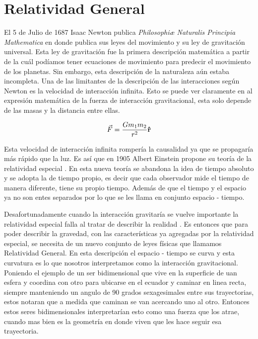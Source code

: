 \documentclass[../Main.tex]{subfiles}
\begin{document}
\section{Relatividad General}
El 5 de Julio de 1687 Isaac Newton publica \textit{Philosophiæ Naturalis Principia Mathematica} \cite{newton87a} en donde publica sus leyes del movimiento y su ley de gravitación universal. Esta ley de gravitación fue la primera descripción matemática a partir de la cuál podíamos tener ecuaciones de movimiento para predecir el movimiento de los planetas. Sin embargo, esta descripción de la naturaleza aún estaba incompleta. Una de las limitantes de la descripción de las interacciones según Newton es la velocidad de interacción infinita. Esto se puede ver claramente en al expresión matemática de la fuerza de interacción gravitacional, esta solo depende de las masas y la distancia entre ellas. 

\begin{equation}
    \vec{F} = \frac{Gm_1m_2}{r^2} \vu{r}
\end{equation}

Esta velocidad de interacción infinita rompería la causalidad ya que se propagaría más rápido que la luz. Es así que en 1905 Albert Einstein propone su teoría de la relatividad especial \cite{einstein}. En esta nueva teoría se abandona la idea de tiempo absoluto y se adopta la de tiempo propio, es decir que cada observador mide el tiempo de manera diferente, tiene su propio tiempo. Además de que el tiempo y el espacio ya no son entes separados por lo que se les llama en conjunto espacio - tiempo.

Desafortunadamente cuando la interacción gravitaría se vuelve importante la relatividad especial falla al tratar de describir la realidad \cite{1994bhtw.bookT}. Es entonces que para poder describir la gravedad, con las características ya agregadas por la relatividad especial, se necesita de un nuevo conjunto de leyes físicas que llamamos Relatividad General. En esta descripción el espacio - tiempo se curva y esta curvatura es lo que nosotros interpretamos como la interacción gravitacional. Poniendo el ejemplo de un ser bidimensional que vive en la superficie de uan esfera y coordina con otro para ubicarse en el ecuador y caminar en linea recta, siempre manteniendo un angulo de 90 grados sexagesimales entre sus trayectorias, estos notaran que a medida que caminan se van acercando uno al otro. Entonces estos seres bidimensionales interpretarían esto como una fuerza que los atrae, cuando mas bien es la geometría en donde viven que les hace seguir esa trayectoria.
\end{document}
